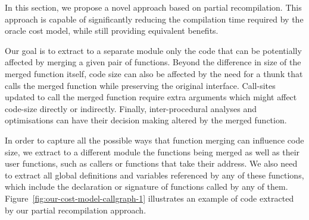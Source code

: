 In this section, we propose a novel approach based on partial recompilation.
This approach is capable of significantly reducing the compilation time required by the oracle cost model, while still providing equivalent benefits.

Our goal is to extract to a separate module only the code that can be potentially affected by merging a given pair of functions.
Beyond the difference in size of the merged function itself, code size can also be affected by the need for a thunk that calls the merged function while preserving the original interface.
Call-sites updated to call the merged function require extra arguments which might affect code-size directly or indirectly. %
Finally, inter-procedural analyses and optimisations can have their decision making altered by the merged function.

In order to capture all the possible ways that function merging can influence code size, we extract to a different module the functions being merged as well as their user functions, such as callers or functions that take their address.
We also need to extract all global definitions and variables referenced by any of these functions, which include the declaration or signature of functions called by any of them.
Figure~\ref{fig:our-cost-model-callgraph-1} illustrates an example of code extracted by our partial recompilation approach.

